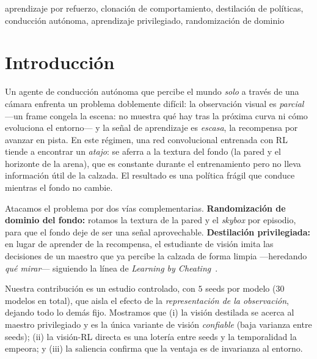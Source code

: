 \documentclass[conference]{IEEEtran}
\begin{document}
\begin{IEEEkeywords}
aprendizaje por refuerzo, clonaci\'on de comportamiento, destilaci\'on de pol\'iticas,
conducci\'on aut\'onoma, aprendizaje privilegiado, randomizaci\'on de dominio
\end{IEEEkeywords}

\section{Introducci\'on}
Un agente de conducci\'on aut\'onoma que percibe el mundo \emph{solo} a trav\'es de una
c\'amara enfrenta un problema doblemente dif\'icil: la observaci\'on visual es \emph{parcial}
---un frame congela la escena: no muestra qu\'e hay tras la pr\'oxima curva ni c\'omo evoluciona
el entorno--- y la se\~nal de
aprendizaje es \emph{escasa}, la recompensa por avanzar en pista. En este r\'egimen, una red
convolucional entrenada con RL tiende a encontrar un \emph{atajo}: se aferra a la textura del
fondo (la pared y el horizonte de la arena), que es constante durante el entrenamiento pero
no lleva informaci\'on \'util de la calzada. El resultado es una pol\'itica fr\'agil que
conduce mientras el fondo no cambie.

Atacamos el problema por dos v\'ias complementarias. \textbf{Randomizaci\'on de dominio del
fondo:} rotamos la textura de la pared y el \emph{skybox} por episodio, para que el fondo deje
de ser una se\~nal aprovechable. \textbf{Destilaci\'on privilegiada:} en lugar de aprender de
la recompensa, el estudiante de visi\'on imita las decisiones de un maestro que ya percibe la
calzada de forma limpia ---heredando \emph{qu\'e mirar}--- siguiendo la l\'inea de
\emph{Learning by Cheating}~\cite{chen2019lbc}.

Nuestra contribuci\'on es un estudio controlado, con $5$ seeds por modelo ($30$
modelos en total), que aisla el efecto de la \emph{representaci\'on de la observaci\'on},
dejando todo lo dem\'as fijo. Mostramos que (i) la visi\'on destilada se acerca al maestro
privilegiado y es la \'unica variante de visi\'on \emph{confiable} (baja varianza entre seeds);
(ii) la visi\'on-RL directa es una loter\'ia entre seeds y la temporalidad la empeora; y (iii) la
saliencia confirma que la ventaja es de invarianza al entorno.
\end{document}
